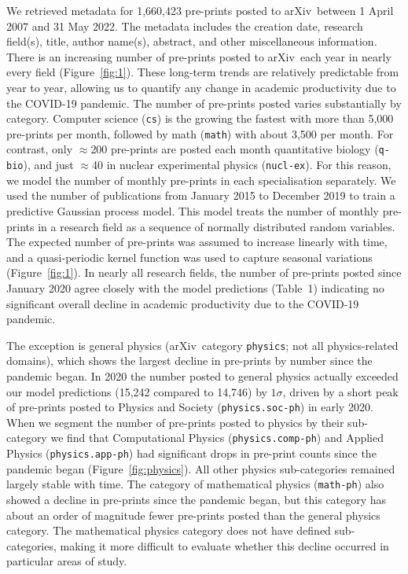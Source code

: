 \documentclass[]{rsos}%
\newcommand{\arxiv}{arXiv}
\newcommand{\change}[1]{#1}
\begin{document}
We retrieved metadata for 1,660,423 pre-prints posted to \arxiv\ between 1 April 2007 and 31 May 2022. The metadata includes the creation date, research field(s), title, author name(s), abstract, and other miscellaneous information\cite{Clement:2019}. There is an increasing number of pre-prints posted to \arxiv\ each year in nearly every field (Figure~\ref{fig:1}). These long-term trends are relatively predictable from year to year, allowing us to quantify any change in academic productivity due to the COVID-19 pandemic. The number of pre-prints posted varies substantially by category. Computer science (\texttt{cs}) is the growing the fastest with more than 5,000 pre-prints per month, followed by math (\texttt{math}) with about 3,500 per month. For contrast, only $\approx$200 pre-prints are posted each month quantitative biology (\texttt{q-bio}), and just $\approx$40 in nuclear experimental physics (\texttt{nucl-ex}). For this reason, we model the number of monthly pre-prints in each specialisation separately. We used the number of publications from January 2015 to December 2019 to train a predictive Gaussian process model\cite{Rasmussen:2006}. This model treats the number of monthly pre-prints in a research field as a sequence of normally distributed random variables. The expected number of pre-prints was assumed to increase linearly with time, and a quasi-periodic kernel function\cite{Rasmussen:2006,Ambikasaran:2014} was used to capture seasonal variations (Figure~\ref{fig:1}). In nearly all research fields, the number of pre-prints posted since January 2020 agree closely with the model predictions (Table~1) indicating no significant overall decline in academic productivity due to the COVID-19 pandemic. %

The exception is general physics (\arxiv\ category \texttt{physics}; not all physics-related domains), which shows the largest decline in pre-prints by number since the pandemic began. In 2020 the number posted to general physics actually exceeded our model predictions (15,242 compared to 14,746) by $1\sigma$, driven by a short peak of pre-prints posted to Physics and Society (\texttt{physics.soc-ph}) in early 2020. When we segment the number of pre-prints posted to physics by their sub-category we find that Computational Physics (\texttt{physics.comp-ph}) and Applied Physics (\texttt{physics.app-ph}) had significant drops in pre-print counts since the pandemic began (Figure~\ref{fig:physics}). All other physics sub-categories remained largely stable with time. The category of mathematical physics (\texttt{math-ph}) also showed a decline in pre-prints since the pandemic began, but this category has about an order of magnitude fewer pre-prints posted than \change{the general} physics \change{category}. The mathematical physics category does not have defined sub-categories, making it more difficult to evaluate whether this decline occurred in particular areas of study.
\end{document}
